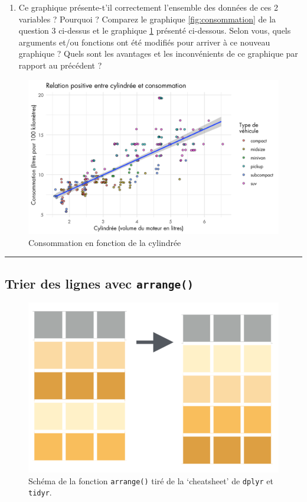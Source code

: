\documentclass[a4paperpaper,]{article}
\providecommand{\tightlist}{%
  \setlength{\itemsep}{0pt}\setlength{\parskip}{0pt}}
\begin{document}
\begin{enumerate}
\def\labelenumi{\arabic{enumi}.}
\setcounter{enumi}{3}
\tightlist
\item
  Ce graphique présente-t'il correctement l'ensemble des données de ces 2 variables ? Pourquoi ? Comparez le graphique \ref{fig:consommation} de la question 3 ci-dessus et le graphique \ref{fig:consommation2} présenté ci-dessous. Selon vous, quels arguments et/ou fonctions ont été modifiés pour arriver à ce nouveau graphique ? Quels sont les avantages et les inconvénients de ce graphique par rapport au précédent ?
\end{enumerate}

\begin{figure}[htpb]

{\centering \includegraphics[width=0.9\linewidth]{figure/consommation2-1} 

}

\caption{Consommation en fonction de la cylindrée}\label{fig:consommation2}
\end{figure}

\begin{center}\rule{0.5\linewidth}{\linethickness}\end{center}

\hypertarget{arrange}{%
\subsection{\texorpdfstring{Trier des lignes avec \texttt{arrange()}}{Trier des lignes avec arrange()}}\label{arrange}}

\begin{figure}[htpb]

{\centering \includegraphics[width=0.4\linewidth]{images/arrange} 

}

\caption{Schéma de la fonction \texttt{arrange()} tiré de la `cheatsheet' de \texttt{dplyr} et \texttt{tidyr}.}\label{fig:arrangefig}
\end{figure}
\end{document}
